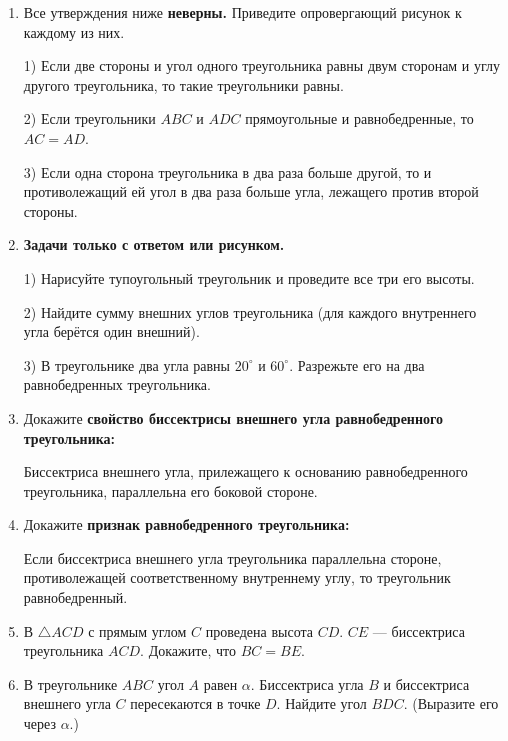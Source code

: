 \begin{enumerate}
    \item Все утверждения ниже \textbf{неверны.} Приведите опровергающий рисунок к каждому из них.

    1) Если две стороны и угол одного треугольника равны двум сторонам и углу другого треугольника, то такие треугольники равны.

    2) Если треугольники $ABC$ и $ADC$ прямоугольные и равнобедренные, то $AC=AD$.

    3) Если одна сторона треугольника в два раза больше другой, то и противолежащий ей угол в два раза больше угла, лежащего против второй стороны.

    \item \textbf{Задачи только с ответом или рисунком.} 
    
    1) Нарисуйте тупоугольный треугольник и проведите все три его высоты. 

    2) Найдите сумму внешних углов треугольника (для каждого внутреннего угла берётся один внешний). 

    3) В треугольнике два угла равны $20^\circ$ и $60^\circ$. Разрежьте его на два равнобедренных треугольника.

    \item Докажите \textbf{свойство биссектрисы внешнего угла равнобедренного треугольника:}

    Биссектриса внешнего угла, прилежащего к основанию равнобедренного треугольника,  параллельна его боковой стороне.

    \item Докажите \textbf{признак равнобедренного треугольника:}

    Если биссектриса внешнего угла треугольника параллельна стороне, противолежащей соответственному внутреннему углу, то треугольник равнобедренный.

    \item В $\triangle{ACD}$ с прямым углом $C$ проведена высота $CD$. $CE$ --- биссектриса треугольника $ACD$. Докажите, что $BC=BE$.

    \item В треугольнике $ABC$ угол $A$ равен $\alpha$. Биссектриса угла $B$ и биссектриса внешнего угла $C$ пересекаются в точке $D$. Найдите угол $BDC$. (Выразите его через $\alpha$.)

\end{enumerate}